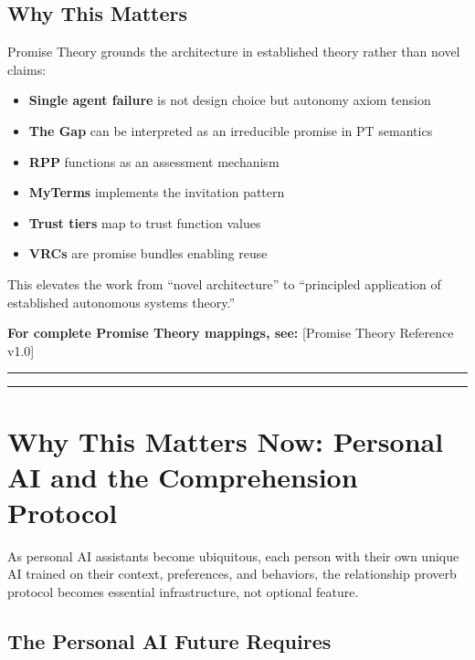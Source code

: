 \documentclass[
]{article}
\providecommand{\tightlist}{%
  \setlength{\itemsep}{0pt}\setlength{\parskip}{0pt}}
\begin{document}
\subsection{Why This Matters}\label{why-this-matters}

Promise Theory grounds the architecture in established theory rather
than novel claims:

\begin{itemize}
\tightlist
\item
  \textbf{Single agent failure} is not design choice but autonomy axiom
  tension
\item
  \textbf{The Gap} can be interpreted as an irreducible promise in PT
  semantics
\item
  \textbf{RPP} functions as an assessment mechanism
\item
  \textbf{MyTerms} implements the invitation pattern
\item
  \textbf{Trust tiers} map to trust function values
\item
  \textbf{VRCs} are promise bundles enabling reuse
\end{itemize}

This elevates the work from ``novel architecture'' to ``principled
application of established autonomous systems theory.''

\textbf{For complete Promise Theory mappings, see:} {[}Promise Theory
Reference v1.0{]}

\begin{center}\rule{0.5\linewidth}{0.5pt}\end{center}

\begin{center}\rule{0.5\linewidth}{0.5pt}\end{center}

\section{Why This Matters Now: Personal AI and the Comprehension
Protocol}\label{why-this-matters-now-personal-ai-and-the-comprehension-protocol}

As personal AI assistants become ubiquitous, each person with their own
unique AI trained on their context, preferences, and behaviors, the
relationship proverb protocol becomes essential infrastructure, not
optional feature.

\subsection{The Personal AI Future
Requires}\label{the-personal-ai-future-requires}
\end{document}
